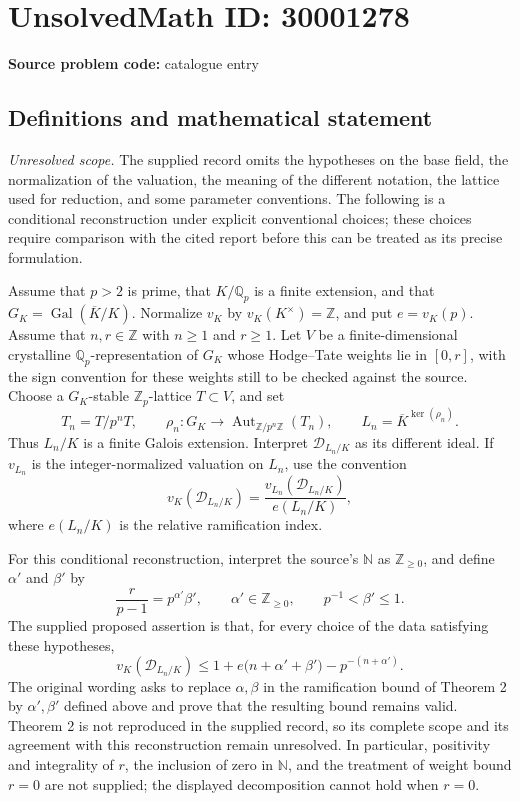 \documentclass[11pt]{article}
\newcommand{\Z}{\mathbb{Z}}
\newcommand{\Q}{\mathbb{Q}}
\begin{document}
\section*{UnsolvedMath ID: 30001278}
\textbf{Source problem code:} catalogue entry
\subsection{Definitions and mathematical statement}
\emph{Unresolved scope.} The supplied record omits the hypotheses on the base field, the normalization of the valuation, the meaning of the different notation, the lattice used for reduction, and some parameter conventions. The following is a conditional reconstruction under explicit conventional choices; these choices require comparison with the cited report before this can be treated as its precise formulation.

Assume that \(p>2\) is prime, that \(K/\Q_p\) is a finite extension, and that \(G_K=\operatorname{Gal}(\overline K/K)\). Normalize \(v_K\) by \(v_K(K^\times)=\Z\), and put \(e=v_K(p)\). Assume that \(n,r\in\Z\) with \(n\geq1\) and \(r\geq1\). Let \(V\) be a finite-dimensional crystalline \(\Q_p\)-representation of \(G_K\) whose Hodge--Tate weights lie in \([0,r]\), with the sign convention for these weights still to be checked against the source. Choose a \(G_K\)-stable \(\Z_p\)-lattice \(T\subset V\), and set
\[
T_n=T/p^nT,\qquad
\rho_n:G_K\longrightarrow\operatorname{Aut}_{\Z/p^n\Z}(T_n),\qquad
L_n=\overline K^{\ker(\rho_n)}.
\]
Thus \(L_n/K\) is a finite Galois extension. Interpret \(\mathcal D_{L_n/K}\) as its different ideal. If \(v_{L_n}\) is the integer-normalized valuation on \(L_n\), use the convention
\[
v_K(\mathcal D_{L_n/K})
=\frac{v_{L_n}(\mathcal D_{L_n/K})}{e(L_n/K)},
\]
where \(e(L_n/K)\) is the relative ramification index.

For this conditional reconstruction, interpret the source's \(\mathbb N\) as \(\Z_{\geq0}\), and define \(\alpha'\) and \(\beta'\) by
\[
\frac{r}{p-1}=p^{\alpha'}\beta',\qquad
\alpha'\in\Z_{\geq0},\qquad p^{-1}<\beta'\leq1.
\]
The supplied proposed assertion is that, for every choice of the data satisfying these hypotheses,
\[
v_K(\mathcal D_{L_n/K})
\leq 1+e\bigl(n+\alpha'+\beta'\bigr)-p^{-(n+\alpha')}.
\]
The original wording asks to replace \(\alpha,\beta\) in the ramification bound of Theorem 2 by \(\alpha',\beta'\) defined above and prove that the resulting bound remains valid. Theorem 2 is not reproduced in the supplied record, so its complete scope and its agreement with this reconstruction remain unresolved. In particular, positivity and integrality of \(r\), the inclusion of zero in \(\mathbb N\), and the treatment of weight bound \(r=0\) are not supplied; the displayed decomposition cannot hold when \(r=0\).
\end{document}
